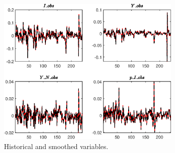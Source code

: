  
\begin{figure}[H]
\centering 
\includegraphics[width=0.80\textwidth]{BRS_growth_res/graphs/BRS_growth_res_HistoricalAndSmoothedVariables1}
\caption{Historical and smoothed variables.}\label{Fig:HistoricalAndSmoothedVariables:1}
\end{figure}


